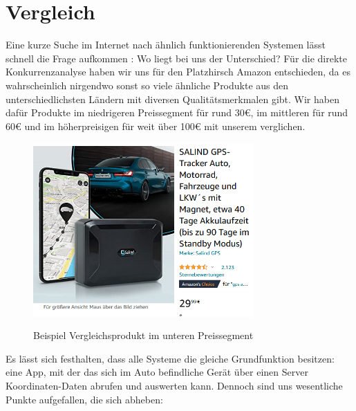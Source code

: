 \section{Vergleich} 
Eine kurze Suche im Internet nach ähnlich funktionierenden  Systemen lässt schnell die Frage aufkommen : 
Wo liegt bei uns der Unterschied?
Für die direkte Konkurrenzanalyse haben wir uns für den Platzhirsch Amazon entschieden, da es wahrscheinlich nirgendwo sonst so viele ähnliche Produkte aus den unterschiedlichsten Ländern mit diversen Qualitätsmerkmalen gibt. Wir haben dafür Produkte im niedrigeren  Preissegment für rund 30€, im mittleren für rund 60€ und im höherpreisigen für weit über 100€ mit unserem verglichen. 
\begin{figure} [H]
	\begin{center}
		\includegraphics[width=0.75\textwidth]{Bilder/Produkt_Vergleich.png}
		\caption{Beispiel Vergleichsprodukt im unteren Preissegment}
		\cite{Salind}
		\label{product_vgl}
	\end{center}
\end{figure}
Es lässt sich festhalten, dass alle Systeme die gleiche Grundfunktion besitzen: eine App, mit der das sich im Auto befindliche Gerät über einen Server Koordinaten-Daten abrufen und auswerten kann. Dennoch sind uns wesentliche Punkte aufgefallen, die sich abheben:

